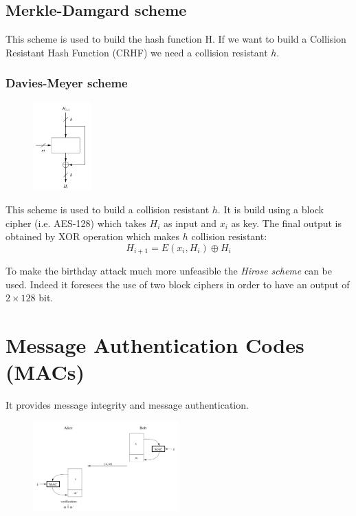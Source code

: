 \documentclass[a4paper,12pt]{article}
\begin{document}
\subsection{Merkle-Damgard scheme}
This scheme is used to build the hash function H. If we want to build a Collision Resistant Hash Function (CRHF) we need a collision resistant $h$.

\subsubsection{Davies-Meyer scheme}
\begin{figure}[H]
  \centering
  \includegraphics[width=0.2\textwidth]{img/davies-meyer}
\end{figure}
This scheme is used to build a collision resistant $h$. It is build using a block cipher (i.e. AES-128) which takes $H_i$ as input and $x_i$ as key.
The final output is obtained by XOR operation which makes $h$ collision resistant:
$$ H_{i+1} = E(x_i, H_i) \oplus H_i $$ 

To make the birthday attack much more unfeasible the \textit{Hirose scheme} can be used. Indeed it foresees the use of two block ciphers in order to have an output of $2\times128$ bit.

\section{Message Authentication Codes (MACs)}
It provides message integrity and message authentication.

\begin{figure}[H]
  \centering
  \includegraphics[width=0.5\textwidth]{img/mac}
\end{figure}
\end{document}
